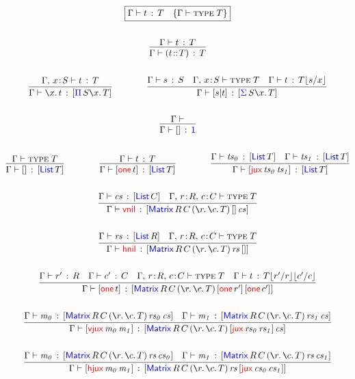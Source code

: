 \documentclass[12pt, a4paper]{article}
\newcommand{\bsl}{\texttt{\symbol{92}}}
\newcommand{\Type}{\textsc{type}\;}
\newcommand{\One}{\single{\D{1}}}
\newcommand{\Nil}{\mathbf{[]}}
\newcommand{\gp}{\,}
\newcommand{\forms}[3]{
  \ifthenelse{\equal{{#2}}{}}
  {\textcolor{#3}{\gp {#1}}}
  {[\textcolor{#3}{#1}\gp {#2}]}
}
\newcommand{\typeIntro}[2]{\forms{#1}{#2}{blue}}
\newcommand{\Pair}[2]{[{#1}|{#2}]}
\newcommand{\subst}[2]{{#1}\lfloor {#2} \rfloor}
\newcommand{\substfor}[3]{\subst{#1}{ {#2} / {#3} }}
\newcommand{\C}[1]{\textcolor{red}{\mathsf{#1}}}
\newcommand{\D}[1]{\textcolor{blue}{\mathsf{#1}}}
\newcommand{\one}[1]{[ \C{one} \gp  {#1} ]}
\newcommand{\List}[1]{[ \D{List} \gp {#1} ]}
\newcommand{\Matrix}[7]{[ \D{Matrix} \gp {#1} \gp {#2} \gp ( \la{#3}\la{#4} {#5}) \gp {#6} \gp {#7}]}
\newcommand{\MRCT}[2]{\Matrix{R}{C}{r}{c}{T}{#1}{#2}}
\newcommand{\vnil}{\single{\C{vnil}}}
\newcommand{\hnil}{\single{\C{hnil}}}
\newcommand{\jux}[2]{[ \C{jux} \gp {#1} \gp {#2}]}
\newcommand{\hjux}[2]{[ \C{hjux} \gp {#1} \gp {#2}]}
\newcommand{\vjux}[2]{[ \C{vjux} \gp {#1} \gp {#2}]}
\newcommand{\ctxValid}[1]{{#1} \vdash}
\newcommand{\ctxType}[2]{{#1} \vdash \Type {#2}}
\newcommand{\hasType}[3]{{#1} \vdash {#2} \hab {#3}}
\newcommand{\rad}[2]{({#1} \!::\! {#2})}
\newcommand{\cs}{,\,}
\newcommand{\hb}{\!:\!}
\newcommand{\hab}{\gp : \gp}
\newcommand{\la}[1]{\bsl{#1}.\,}
\newcommand{\V}[1]{\mathit{#1}}
\newcommand{\single}[1]{#1}
\begin{document}
\begin{gather*}
  \fbox{$\hasType{\Gamma}{t}{T} \quad \{ \ctxType{\Gamma}{T}  \}$}
  \\ \\
  \infer
  {\hasType{\Gamma}{\rad{t}{T}}{T}}
  {\hasType{\Gamma}{t}{T}}
  \\ \\
  \infer{\hasType{\Gamma}{\la{x} t}{\typeIntro{\Pi}{S \la{x}  T}}}{\hasType{\Gamma \cs x \hb S}{t}{T}}
  \qquad\qquad
  \infer{\hasType{\Gamma}{\Pair{s}{t}}{\typeIntro{\Sigma}{S \la{x} T}}}{\hasType{\Gamma}{s}{S} & \ctxType{\Gamma \cs x \hb S}{T} & \hasType{\Gamma}{t}{\substfor{T}{s}{x}}}
  \\ \\
  \infer{\hasType{\Gamma}{\Nil}{\One}}{\ctxValid{\Gamma}}
  \\ \\
  \infer{\hasType{\Gamma}{\Nil}{\List{T}}}{\ctxType{\Gamma}{T}}
  \qquad\qquad
  \infer{\hasType{\Gamma}{\one{t}}{\List{T}}}{\hasType{\Gamma}{t}{T}}
  \qquad\qquad \infer{\hasType{\Gamma}{\jux{\V{ts_{0}}}{\V{ts_{1}}}}{\List{T}}}{\hasType{\Gamma}{\V{ts_{0}}}{\List{T}} & \hasType{\Gamma}{\V{ts_{1}}}{\List{T}}}
  \\ \\
  \infer{\hasType{\Gamma}{\vnil}{\MRCT{\Nil}{\V{cs}}}}{\hasType{\Gamma}{\V{cs}}{\List{C}} & \ctxType{\Gamma \cs r \hb  R \cs c \hb C}{T}}
  \\ \\
  \infer{\hasType{\Gamma}{\hnil}{\MRCT{\V{rs}}{\Nil}}}{\hasType{\Gamma}{\V{rs}}{\List{R}} & \ctxType{\Gamma \cs r \hb  R \cs c \hb C}{T}}
  \\ \\
  \infer{\hasType{\Gamma}{\one{t}}{\MRCT{\one{r'}}{\one{c'}}}}{\hasType{\Gamma}{r'}{R} & \hasType{\Gamma}{c'}{C} & \ctxType{\Gamma \cs r \hb  R \cs c \hb C}{T} & \hasType{\Gamma}{t}{\substfor{\substfor{T}{r'}{r}}{c'}{c}}}
  \\ \\
  \infer{\hasType{\Gamma}{\vjux{\V{m_{0}}}{\V{m_{1}}}}{\MRCT{\jux{\V{rs_{0}}}{\V{rs_{1}}}}{\V{cs}}}}{\hasType{\Gamma}{\V{m_{0}}}{\MRCT{\V{rs_{0}}}{\V{cs}}} & \hasType{\Gamma}{\V{m_{1}}}{\MRCT{\V{rs_{1}}}{\V{cs}}}}
  \\ \\
  \infer{\hasType{\Gamma}{\hjux{\V{m_{0}}}{\V{m_{1}}}}{\MRCT{\V{rs}}{\jux{\V{cs_{0}}}{\V{cs_{1}}}}}}{\hasType{\Gamma}{\V{m_{0}}}{\MRCT{\V{rs}}{\V{cs_{0}}}} & \hasType{\Gamma}{\V{m_{1}}}{\MRCT{\V{rs}}{\V{cs_{1}}}}}
\end{gather*}
\end{document}
